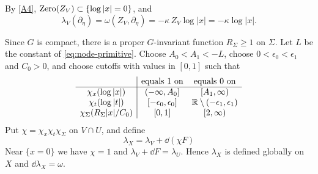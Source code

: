 \documentclass[12pt, letter]{amsart}
\theoremstyle{definition}
\begin{document}
By \ref{A4}, $\operatorname{Zero}(Z_V)\subset\{\log|x|=0\}$, and
\[
 \lambda_V(\partial_\eta)=\omega(Z_V,\partial_\eta)=-\kappa\,Z_V\log|x|=-\kappa\log|x| .
\]

Since $G$ is compact, there is a proper $G$-invariant function $R_\Sigma\ge1$ on $\Sigma$.
Let $L$ be the constant of \eqref{eq:node-primitive}.
Choose $A_0<A_1<-L$, choose $0<\epsilon_0<\epsilon_1$ and $C_0>0$, and choose cutoffs with values in $[0,1]$ such that
\[
\begin{array}{c|cc}
 &\text{equals }1\text{ on}&\text{equals }0\text{ on}\\ \hline
 \chi_x(\log|x|)&(-\infty,A_0]&[A_1,\infty)\\
 \chi_t(\log|t|)&[-\epsilon_0,\epsilon_0]&\mathbb{R}\setminus(-\epsilon_1,\epsilon_1)\\
 \chi_\Sigma(R_\Sigma|x|/C_0)&[0,1]&[2,\infty)
\end{array}
\]
Put $\chi=\chi_x\chi_t\chi_\Sigma$ on $V\cap U$, and define
\[
 \lambda_X= \lambda_V+\dd(\chi F)
\]
Near \( \{x = 0\} \) we have $\chi=1$ and $\lambda_V+\dd F=\lambda_U$. Hence \(\lambda_X\) is defined globally on \(X\) and \(\dd \lambda_X = \omega\).  
\end{document}
